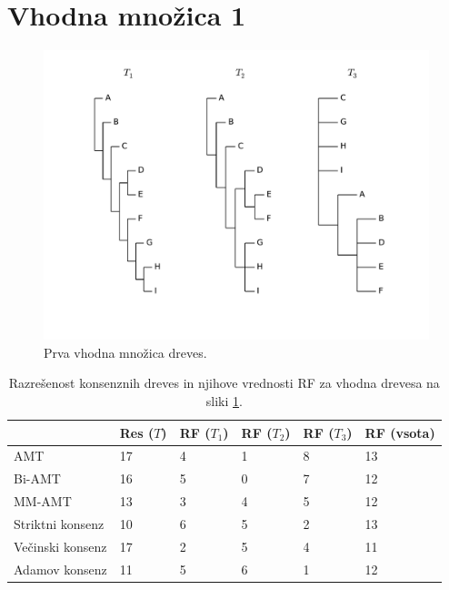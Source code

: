 \documentclass[a4paper, 12pt]{book}
\begin{document}
\section{Vhodna množica 1}
\begin{figure}[h!]
	\begin{center}
		\includegraphics[scale=0.45, clip=true, trim=1cm 2cm 1cm 0]{gfx/eval_input.pdf}
	\end{center}
	\caption{Prva vhodna množica dreves.}
	\label{img-eval-input}
\end{figure}

\begin{table}[h!]
	\begin{center}
	{\footnotesize
	\begin{tabular}{ l| l | l | l | l | l }
	~                & Res ($T$) & RF ($T_1$) & RF ($T_2$) & RF ($T_3$) & RF (vsota) \\ \hline
	AMT              & 17          & 4             & 1             & 8             & 13         \\ \hline
	Bi-AMT           & 16          & 5             & 0             & 7             & 12         \\ \hline
	MM-AMT           & 13          & 3             & 4             & 5             & 12         \\ \hline
	Striktni konsenz & 10          & 6             & 5             & 2             & 13         \\ \hline
	Večinski konsenz & 17          & 2             & 5             & 4             & 11         \\ \hline
	Adamov konsenz   & 11          & 5             & 6             & 1             & 12         \\ \hline
	\end{tabular}
	\caption{\label{table-eval-1}Razrešenost konsenznih dreves in njihove vrednosti RF za vhodna drevesa na sliki \ref{img-eval-input}.
    }
	}
	\end{center}		
\end{table}
\end{document}

